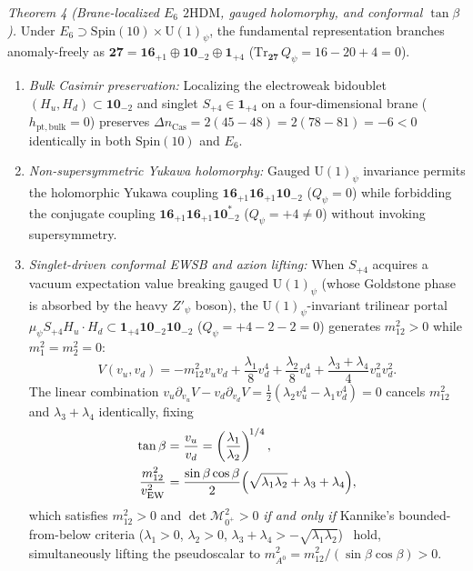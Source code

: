 \documentclass[aps,prd,twocolumn,nofootinbib,floatfix]{revtex4-2}
\begin{document}
\emph{Theorem 4 (Brane-localized $E_6$ $2\mathrm{HDM}$, gauged holomorphy, and conformal $\tan\beta$).}
Under $E_6 \supset \mathrm{Spin}(10)\times\mathrm{U}(1)_\psi$, the fundamental representation branches anomaly-freely as $\mathbf{27} = \mathbf{16}_{+1} \oplus \mathbf{10}_{-2} \oplus \mathbf{1}_{+4}$ ($\mathrm{Tr}_{\mathbf{27}}\,Q_\psi = 16 - 20 + 4 = 0$).
\begin{enumerate}
    \item \emph{Bulk Casimir preservation:} Localizing the electroweak bidoublet $(H_u, H_d) \subset \mathbf{10}_{-2}$ and singlet $S_{+4} \in \mathbf{1}_{+4}$ on a four-dimensional brane ($h_{\mathrm{pt,bulk}} = 0$) preserves $\Delta n_{\mathrm{Cas}} = 2(45 - 48) = 2(78 - 81) = -6 < 0$ identically in both $\mathrm{Spin}(10)$ and $E_6$.
    \item \emph{Non-supersymmetric Yukawa holomorphy:} Gauged $\mathrm{U}(1)_\psi$ invariance permits the holomorphic Yukawa coupling $\mathbf{16}_{+1}\mathbf{16}_{+1}\mathbf{10}_{-2}$ ($Q_\psi = 0$) while forbidding the conjugate coupling $\mathbf{16}_{+1}\mathbf{16}_{+1}\mathbf{10}_{-2}^*$ ($Q_\psi = +4 \ne 0$) without invoking supersymmetry.
    \item \emph{Singlet-driven conformal EWSB and axion lifting:} When $S_{+4}$ acquires a vacuum expectation value breaking gauged $\mathrm{U}(1)_\psi$ (whose Goldstone phase is absorbed by the heavy $Z'_\psi$ boson), the $\mathrm{U}(1)_\psi$-invariant trilinear portal $\mu_\psi S_{+4} H_u\cdot H_d \subset \mathbf{1}_{+4}\mathbf{10}_{-2}\mathbf{10}_{-2}$ ($Q_\psi = +4 - 2 - 2 = 0$) generates $m_{12}^2 > 0$ while $m_1^2 = m_2^2 = 0$:
    \begin{equation}
    \label{eq:v_conformal_2hdm}
    V(v_u, v_d) = -m_{12}^2 v_u v_d + \frac{\lambda_1}{8}v_d^4 + \frac{\lambda_2}{8}v_u^4 + \frac{\lambda_3 + \lambda_4}{4}v_u^2 v_d^2.
    \end{equation}
    The linear combination $v_u\partial_{v_u}V - v_d\partial_{v_d}V = \frac{1}{2}(\lambda_2 v_u^4 - \lambda_1 v_d^4) = 0$ cancels $m_{12}^2$ and $\lambda_3 + \lambda_4$ identically, fixing
    \begin{align}
    \label{eq:tanbeta_conformal}
    \tan\beta &= \frac{v_u}{v_d} = \left(\frac{\lambda_1}{\lambda_2}\right)^{\!1/4}, \nonumber\\
    \frac{m_{12}^2}{v_{\mathrm{EW}}^2} &= \frac{\sin\beta\cos\beta}{2}\Bigl(\sqrt{\lambda_1\lambda_2} + \lambda_3 + \lambda_4\Bigr),
    \end{align}
    which satisfies $m_{12}^2 > 0$ and $\det\mathcal{M}_{0^+}^2 > 0$ \emph{if and only if} Kannike's bounded-from-below criteria ($\lambda_1 > 0$, $\lambda_2 > 0$, $\lambda_3 + \lambda_4 > -\sqrt{\lambda_1\lambda_2}$)~\cite{Kannike2012} hold, simultaneously lifting the pseudoscalar to $m_{A^0}^2 = m_{12}^2/(\sin\beta\cos\beta) > 0$.
\end{enumerate}
\end{document}
